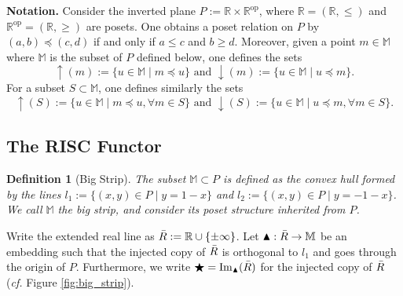 \documentclass[11pt]{article}
\newtheorem{definition}[theorem]{Definition}
\theoremstyle{remark}
\newcommand{\R}{\mathbb{R}}
\newcommand{\M}{\mathbb{M}}
\begin{document}
\bigskip

\noindent \textbf{Notation.} Consider the inverted plane $P:=\R\times\R^{\mathrm{op}}$, where $\R=(\R,\leq)$ and $\R^{\mathrm{op}}=(\R,\geq)$ are posets. One obtains a poset relation on $P$ by $(a,b)\preceq (c,d)$ if and only if $a\leq c$ and $b\geq d$. Moreover, given a point $m\in\M$ where $\M$ is the subset of $P$ defined below, one defines the sets $$\uparrow(m):=\{u\in\M\mid m\preceq u\}\text{ and }\downarrow(m):=\{u\in\M\mid u\preceq m\}.$$ For a subset $S\subset\M$, one defines similarly the sets $$\uparrow(S):=\{u\in\M\mid m\preceq u, \forall m\in S\}\text{ and }\downarrow(S):=\{u\in\M\mid u\preceq m, \forall m\in S\}.$$ 

\subsection{The RISC Functor}

\begin{definition}[Big Strip]
The subset $\M\subset P$ is defined as the convex hull formed by the lines $l_1:=\{(x,y)\in P\mid y=1-x\}$ and $l_2:=\{(x,y)\in P\mid y=-1-x\}$. We call $\M$ the \emph{big strip}, and consider its poset structure inherited from $P$.
\end{definition}



\noindent Write the extended real line as $\Bar{R}:=\R\cup\{\pm\infty\}$. Let $\blacktriangle:\Bar{R}\rightarrow \M$ be an embedding such that the injected copy of $\Bar{R}$ is orthogonal to $l_1$ and goes through the origin of $P$. Furthermore, we write $\bigstar=\mathrm{Im}_\blacktriangle(\Bar{R})$ for the injected copy of $\Bar{R}$ (\textit{cf.} Figure \ref{fig:big_strip}). \\
\end{document}
